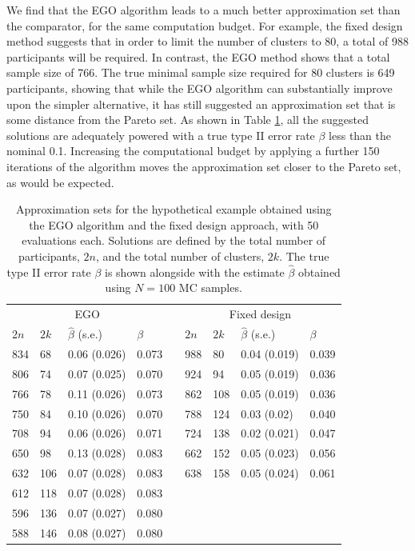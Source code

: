 \documentclass[sagev, Crown]{sagej}
\begin{document}
We find that the EGO algorithm leads to a much better approximation set than the comparator, for the same computation budget. For example, the fixed design method suggests that in order to limit the number of clusters to 80, a total of 988 participants will be required. In contrast, the EGO method shows that a total sample size of 766. The true minimal sample size required for 80 clusters is 649 participants, showing that while the EGO algorithm can substantially improve upon the simpler alternative, it has still suggested an approximation set that is some distance from the Pareto set. As shown in Table \ref{tab:ex4_single_run}, all the suggested solutions are adequately powered with a true type II error rate $\beta$ less than the nominal 0.1. Increasing the computational budget by applying a further 150 iterations of the algorithm moves the approximation set closer to the Pareto set, as would be expected. 

\begin{table}
\small\sf\centering
\caption{Approximation sets for the hypothetical example obtained using the EGO algorithm and the fixed design approach, with 50 evaluations each. Solutions are defined by the total number of participants, $2n$, and the total number of clusters, $2k$. The true type II error rate $\beta$ is shown alongside with the estimate $\hat{\beta}$ obtained using $N = 100$ MC samples.}
\begin{tabular}{llllcllll}
  \toprule
   \multicolumn{4}{c}{EGO} & \phantom{a} & \multicolumn{4}{c}{Fixed design} \\ \cmidrule{1-4} \cmidrule{6-9} 
$2n$ & $2k$ & $\hat{\beta}$ (s.e.) & $\beta$ && $2n$ & $2k$ & $\hat{\beta}$ (s.e.) & $\beta$ \\ 
  \midrule
834	& 68	& 0.06 (0.026)	& 0.073 && 988	& 80	& 0.04 (0.019)	& 0.039 \\
806	& 74	& 0.07 (0.025)	& 0.070 && 924	& 94	& 0.05 (0.019)	& 0.036 \\
766	& 78	& 0.11 (0.026)	& 0.073 && 862	& 108	& 0.05 (0.019)	& 0.036 \\
750	& 84	& 0.10 (0.026)	& 0.070 && 788	& 124	& 0.03 (0.02)	& 0.040 \\
708	& 94	& 0.06 (0.026)	& 0.071 && 724	& 138	& 0.02 (0.021)	& 0.047 \\
650	& 98	& 0.13 (0.028)	& 0.083 && 662	& 152	& 0.05 (0.023)	& 0.056 \\
632	& 106	& 0.07 (0.028)	& 0.083 && 638	& 158	& 0.05 (0.024)	& 0.061 \\
612	& 118	& 0.07 (0.028)	& 0.083 &&  &  &  &  \\ 
596	& 136	& 0.07 (0.027)	& 0.080 &&  &  &  &  \\ 
588	& 146	& 0.08 (0.027)	& 0.080 &&  &  &  &  \\ 
   \bottomrule
\end{tabular}
\label{tab:ex4_single_run}
\end{table}
\end{document}
